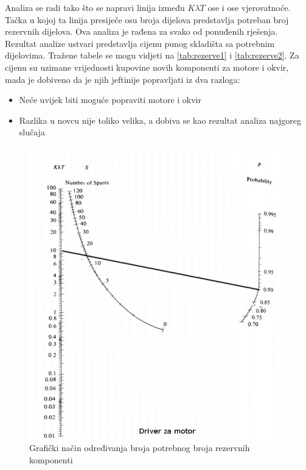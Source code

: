 \documentclass[12pt]{article}
\begin{document}
Analiza se radi tako što se napravi linija između $K\lambda T$ ose i ose vjerovatnoće. Tačka u kojoj ta linija presiječe osu broja dijelova predstavlja potreban broj rezervnih dijelova. Ova analiza je rađena za svako od ponuđenih rješenja. Rezultat analize ustvari predstavlja cijenu punog skladišta sa potrebnim dijelovima. Tražene tabele se mogu vidjeti na \ref{tab:rezerve1} i \ref{tab:rezerve2}. Za cijenu su uzimane vrijednosti kupovine novih komponenti za motore i okvir, mada je dobiveno da je njih jeftinije popravljati iz dva razloga:
\begin{itemize}
\item Neće uvijek biti moguće popraviti motore i okvir
\item Razlika u novcu nije toliko velika, a dobiva se kao rezultat analiza najgoreg slučaja
\end{itemize}

\begin{figure}[!h]
\includegraphics[scale=0.6]{driver_za_motore.png}
\caption{Grafički način određivanja broja potrebnog broja rezervnih komponenti}
\label{slika_rezerve}
\end{figure}
\end{document}
